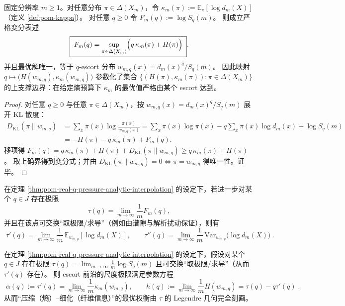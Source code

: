 \begin{theorem}\label{thm:pom-kappa-gibbs-variational-escort-frontier}
固定分辨率 \(m\ge 1\)。对任意分布 \(\pi\in\Delta(X_m)\)，令
\(
\kappa_m(\pi):=\mathbb{E}_{\pi}[\log d_m(X)]
\)
（定义 \ref{def:pom-kappa}）。
对任意 \(q\ge 0\) 令 \(F_m(q):=\log S_q(m)\)。
则成立严格变分表述
\[
\boxed{\;
F_m(q)=\sup_{\pi\in\Delta(X_m)}\Bigl(q\,\kappa_m(\pi)+H(\pi)\Bigr)\; }.
\]
并且最优解唯一，等于 \(q\)-escort 分布 \(w_{m,q}(x)=d_m(x)^q/S_q(m)\)。
因此映射
\(
q\mapsto \bigl(H(w_{m,q}),\kappa_m(w_{m,q})\bigr)
\)
参数化了集合 \(\{(H(\pi),\kappa_m(\pi)):\pi\in\Delta(X_m)\}\) 的上支撑边界：在给定熵预算下 \(\kappa_m\) 的最优值严格由某个 escort 达到。
\end{theorem}
\begin{proof}
对任意 \(q\ge 0\) 与任意 \(\pi\in\Delta(X_m)\)，按 \(w_{m,q}(x)=d_m(x)^q/S_q(m)\) 展开 KL 散度：
\[
\begin{aligned}
D_{\mathrm{KL}}(\pi\|w_{m,q})
&=\sum_x \pi(x)\log\frac{\pi(x)}{w_{m,q}(x)}
=\sum_x \pi(x)\log\pi(x)-q\sum_x \pi(x)\log d_m(x)+\log S_q(m)\\
&=-H(\pi)-q\,\kappa_m(\pi)+F_m(q).
\end{aligned}
\]
移项得
\(
F_m(q)=q\,\kappa_m(\pi)+H(\pi)+D_{\mathrm{KL}}(\pi\|w_{m,q})
\ge q\,\kappa_m(\pi)+H(\pi)
\)。
取上确界得到变分式；并由 \(D_{\mathrm{KL}}(\pi\|w_{m,q})=0\Leftrightarrow \pi=w_{m,q}\) 得唯一性。证毕。
\end{proof}

\begin{corollary}\label{cor:pom-pressure-derivatives-from-escort}
在定理 \ref{thm:pom-real-q-pressure-analytic-interpolation} 的设定下，若进一步对某个 \(q\in J\) 存在极限
\[
\tau(q)=\lim_{m\to\infty}\frac{1}{m}F_m(q),
\]
并且在该点可交换“取极限/求导”（例如由谱隙与解析扰动保证），则有
\[
\boxed{\;
\tau'(q)=\lim_{m\to\infty}\frac{1}{m}\,\mathbb{E}_{w_{m,q}}[\log d_m(X)],\qquad
\tau''(q)=\lim_{m\to\infty}\frac{1}{m}\,\mathrm{Var}_{w_{m,q}}\!\bigl(\log d_m(X)\bigr)\; }.
\]
\end{corollary}

\begin{corollary}\label{cor:pom-escort-frontier-limit-param}
在定理 \ref{thm:pom-real-q-pressure-analytic-interpolation} 的设定下，假设对某个 \(q\in J\) 存在极限
\(
\tau(q)=\lim_{m\to\infty}\frac{1}{m}\log S_q(m)
\)
且可交换“取极限/求导”（从而 \(\tau'(q)\) 存在）。
则 escort 前沿的尺度极限满足参数方程
\[
\boxed{\;
\alpha(q):=\tau'(q)=\lim_{m\to\infty}\frac{1}{m}\kappa_m(w_{m,q}),\qquad
h(q):=\lim_{m\to\infty}\frac{1}{m}H(w_{m,q})=\tau(q)-q\tau'(q)\; }.
\]
从而“压缩（熵）--细化（纤维信息）”的最优权衡由 \(\tau\) 的 Legendre 几何完全刻画。
\end{corollary}

